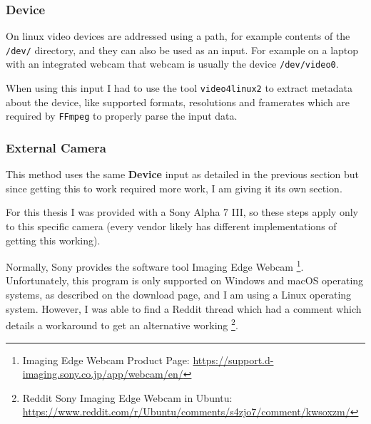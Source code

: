\subsubsection{Device}

On linux video devices are addressed using a path, for example contents of the \texttt{/dev/} directory, and they can also be used as an input. For example on a laptop with an integrated webcam that webcam is usually the device \texttt{/dev/video0}.

When using this input I had to use the tool \texttt{video4linux2} to extract metadata about the device, like supported formats, resolutions and framerates which are required by \texttt{FFmpeg} to properly parse the input data.

\subsubsection{External Camera\label{sec:ext_cam}}

This method uses the same \textbf{Device} input as detailed in the previous section but since getting this to work required more work, I am giving it its own section.

For this thesis I was provided with a Sony Alpha 7 III, so these steps apply only to this specific camera (every vendor likely has different implementations of getting this working).

Normally, Sony provides the software tool Imaging Edge Webcam \footnote{Imaging Edge Webcam Product Page: \url{https://support.d-imaging.sony.co.jp/app/webcam/en/}}. Unfortunately, this program is only supported on Windows and macOS operating systems, as described on the download page, and I am using a Linux operating system. However, I was able to find a Reddit thread which had a comment which details a workaround to get an alternative working \footnote{Reddit Sony Imaging Edge Webcam in Ubuntu: \url{https://www.reddit.com/r/Ubuntu/comments/s4zjo7/comment/kwsoxzm/}}.


